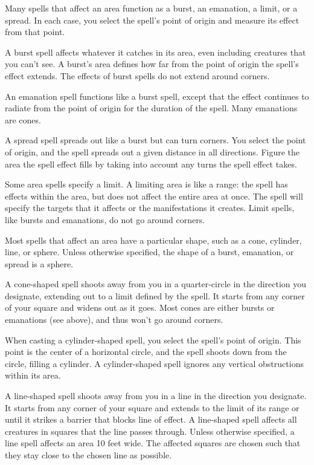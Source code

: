  Many spells that affect an area function as a burst, an emanation, a limit, or a spread. In each case, you select the spell's point of origin and measure its effect from that point.

A burst spell affects whatever it catches in its area, even including creatures that you can't see. A burst's area defines how far from the point of origin the spell's effect extends. The effects of burst spells do not extend around corners.

An emanation spell functions like a burst spell, except that the effect continues to radiate from the point of origin for the duration of the spell. Many emanations are cones.

A spread spell spreads out like a burst but can turn corners. You select the point of origin, and the spell spreads out a given distance in all directions. Figure the area the spell effect fills by taking into account any turns the spell effect takes.

 Some area spells specify a limit. A limiting area is like a range: the spell has effects within the area, but does not affect the entire area at once. The spell will specify the targets that it affects or the manifestations it creates. Limit spells, like bursts and emanations, do not go around corners.

 Most spells that affect an area have a particular shape, such as a cone, cylinder, line, or sphere. Unless otherwise specified, the shape of a burst, emanation, or spread is a sphere.

A cone-shaped spell shoots away from you in a quarter-circle in the direction you designate, extending out to a limit defined by the spell. It starts from any corner of your square and widens out as it goes. Most cones are either bursts or emanations (see above), and thus won't go around corners.

When casting a cylinder-shaped spell, you select the spell's point of origin. This point is the center of a horizontal circle, and the spell shoots down from the circle, filling a cylinder. A cylinder-shaped spell ignores any vertical obstructions within its area.

A line-shaped spell shoots away from you in a line in the direction you designate. It starts from any corner of your square and extends to the limit of its range or until it strikes a barrier that blocks line of effect. A line-shaped spell affects all creatures in squares that the line passes through. Unless otherwise specified, a line spell affects an area 10 feet wide. The affected squares are chosen such that they stay close to the chosen line as possible.

